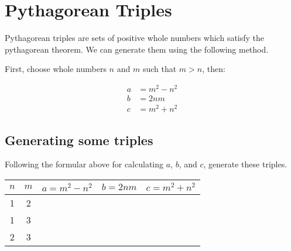 \documentclass[12pt,letterpaper]{article}
\begin{document}
\section*{Pythagorean Triples}

Pythagorean triples are sets of positive whole numbers which satisfy the pythagorean theorem.
We can generate them using the following method.

First, choose whole numbers $n$ and $m$ such that $m > n$, then:

\begin{align*} 
a &= m^2 - n^2 \\
b &= 2nm \\
c &= m^2 + n^2 
\end{align*}

\subsection*{Generating some triples}

Following the formular above for calculating $a$, $b$, and $c$, generate these triples.

\begin{table}[ht]
  \begin{tabular}{c|c|c|c|c}
     $n$ & $m$ & $a = m^2 - n^2$ & $b = 2nm$ & $c = m^2 + n^2$ \\
      \hline
      1  &  2  &   &   &   \\
      1  &  3  &   &   &   \\
      2  &  3  &   &   &   \\
  \end{tabular}
\end{table}
\end{document}
